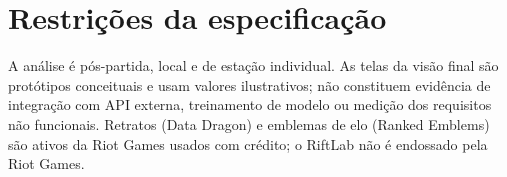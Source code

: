 \documentclass[12pt,a4paper]{article}
\begin{document}
\section{Restrições da especificação}
A análise é pós-partida, local e de estação individual. As telas da visão final são
protótipos conceituais e usam valores ilustrativos; não constituem evidência de
integração com API externa, treinamento de modelo ou medição dos requisitos não
funcionais. Retratos (Data Dragon) e emblemas de elo (Ranked Emblems) são ativos da Riot
Games usados com crédito; o RiftLab não é endossado pela Riot Games.
\end{document}
